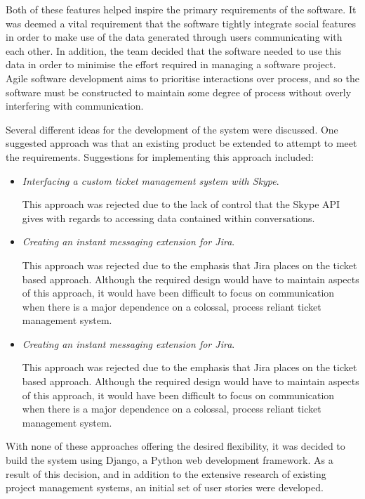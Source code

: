 \documentclass[a4paper]{l3proj}
\begin{document}
Both of these features helped inspire the primary requirements of the software. It was deemed a vital requirement that the software tightly integrate social features in order to make use of the data generated through users communicating with each other. In addition, the team decided that the software needed to use this data in order to minimise the effort required in managing a software project. Agile software development aims to prioritise interactions over process, and so the software must be constructed to maintain some degree of process without overly interfering with communication.

Several different ideas for the development of the system were discussed. One suggested approach was that an existing product be extended to attempt to meet the requirements. Suggestions for implementing this approach included:

\begin{itemize}
\item \textit{Interfacing a custom ticket management system with Skype}. \par This approach was rejected due to the lack of control that the Skype API gives with regards to accessing data contained within conversations.
\item \textit{Creating an instant messaging extension for Jira}. \par This approach was rejected due to the emphasis that Jira places on the ticket based approach. Although the required design would have to maintain aspects of this approach, it would have been difficult to focus on communication when there is a major dependence on a colossal, process reliant ticket management system.

\item \textit{Creating an instant messaging extension for Jira}. \par This approach was rejected due to the emphasis that Jira places on the ticket based approach. Although the required design would have to maintain aspects of this approach, it would have been difficult to focus on communication when there is a major dependence on a colossal, process reliant ticket management system.

\end{itemize}

With none of these approaches offering the desired flexibility, it was decided to build the system using Django, a Python web development framework.  As a result of this decision, and in addition to the extensive research of existing project management systems, an initial set of user stories were developed.
\end{document}
